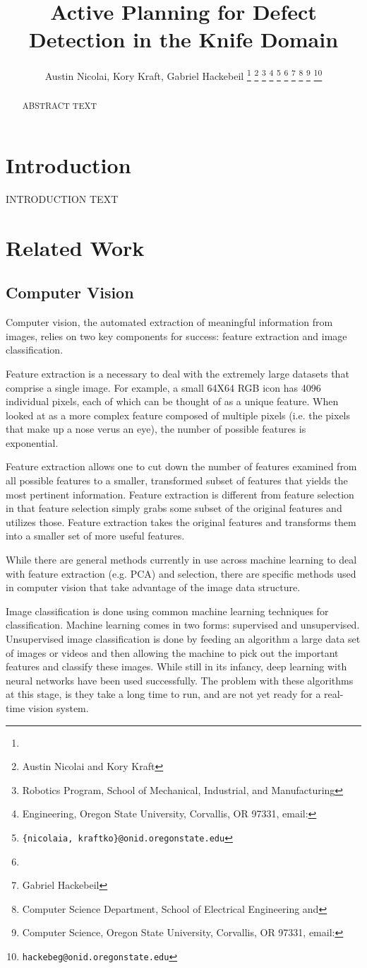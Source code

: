 \documentclass[letterpaper, 10 pt, conference]{ieeeconf}  %
\title{\LARGE \bf 
Active Planning for Defect Detection in the Knife Domain
}
\author{Austin Nicolai, Kory Kraft, Gabriel Hackebeil%
\thanks{\hrulefill}
\thanks{Austin Nicolai and Kory Kraft}
\thanks{Robotics Program, School of Mechanical, Industrial, and Manufacturing}
\thanks{Engineering, Oregon State University, Corvallis, OR 97331, email: }
\thanks{{\tt\small \{nicolaia, kraftko\}@onid.oregonstate.edu}}
\thanks{\hfill}
\thanks{Gabriel Hackebeil}
\thanks{Computer Science Department, School of Electrical Engineering and}
\thanks{Computer Science, Oregon State University, Corvallis, OR 97331, email: }
\thanks{{\tt\small hackebeg@onid.oregonstate.edu}}
}
\begin{document}
\maketitle
\thispagestyle{empty}
\pagestyle{empty}

\begin{abstract}
ABSTRACT TEXT
\end{abstract}


\section{Introduction}

INTRODUCTION TEXT\cite{placeholder}

\section{Related Work}

\subsection{Computer Vision}

Computer vision, the automated extraction of meaningful information from images, relies on two key components for success: feature extraction and image classification. 

Feature extraction is a necessary to deal with the extremely large datasets that comprise a single image.  For example, a small 64X64 RGB icon has 4096 individual pixels, each of which can be thought of as a unique feature. When looked at as a more complex feature composed of multiple pixels (i.e. the pixels that make up a nose verus an eye), the number of possible features is exponential. 

Feature extraction allows one to cut down the number of features examined from all possible features to a smaller, transformed subset of features that yields the most pertinent information. Feature extraction is different from feature selection in that feature selection simply grabs some subset of the original features and utilizes those.  Feature extraction takes the original features and transforms them into a smaller set of more useful features.

While there are general methods currently in use across machine learning to deal with feature extraction (e.g. PCA) and selection, there are specific methods used in computer vision that take advantage of the image data structure.

Image classification is done using common machine learning techniques for classification. Machine learning comes in two forms: supervised and unsupervised. Unsupervised image classification is done by feeding an algorithm a large data set of images or videos and then allowing the machine to pick out the important features and classify these images. While still in its infancy, deep learning with neural networks have been used successfully. The problem with these algorithms at this stage, is they take a long time to run, and are not yet ready for a real-time vision system. 
\end{document}
